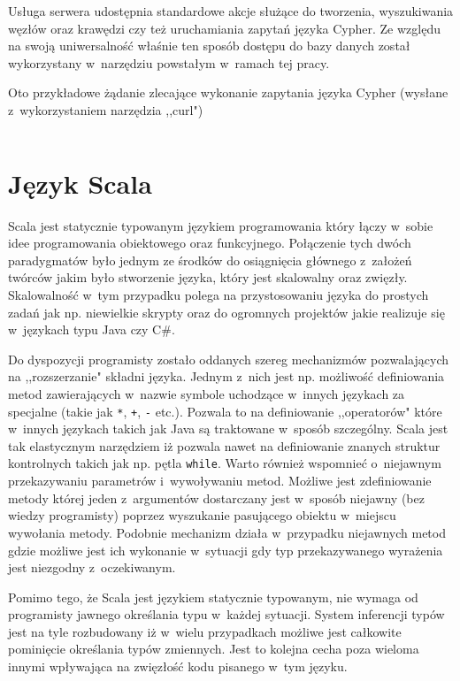 \documentclass{xmgr}
\begin{document}
Usługa serwera udostępnia standardowe akcje służące do tworzenia, wyszukiwania węzłów oraz krawędzi czy też uruchamiania zapytań języka Cypher. Ze względu na swoją uniwersalność właśnie ten sposób dostępu do bazy danych został wykorzystany w~narzędziu powstałym w~ramach tej pracy.

Oto przykładowe żądanie zlecające wykonanie zapytania języka Cypher (wysłane z~wykorzystaniem narzędzia ,,curl")

\inputminted{bash}{listings/bash/neo4j-rest-cypher.sh}

\chapter{Język Scala}

Scala jest statycznie typowanym językiem programowania który łączy w~sobie idee programowania obiektowego oraz funkcyjnego. Połączenie tych dwóch paradygmatów było jednym ze środków do osiągnięcia głównego z~założeń twórców jakim było stworzenie języka, który jest skalowalny oraz zwięzły. Skalowalność w~tym przypadku polega na przystosowaniu języka do prostych zadań jak np. niewielkie skrypty oraz do ogromnych projektów jakie realizuje się w~językach typu Java czy C\#.

Do dyspozycji programisty zostało oddanych szereg mechanizmów pozwalających na ,,rozszerzanie" składni języka. Jednym z~nich jest np. możliwość definiowania metod zawierających w~nazwie symbole uchodzące w~innych językach za specjalne (takie jak \texttt{*}, \texttt{+}, \texttt{-} etc.). Pozwala to na definiowanie ,,operatorów" które w~innych językach takich jak Java są traktowane w~sposób szczególny. Scala jest tak elastycznym narzędziem iż pozwala nawet na definiowanie znanych struktur kontrolnych takich jak np. pętla \texttt{while}. Warto również wspomnieć o~niejawnym przekazywaniu parametrów i~wywoływaniu metod. Możliwe jest zdefiniowanie metody której jeden z~argumentów dostarczany jest w~sposób niejawny (bez wiedzy programisty) poprzez wyszukanie pasującego obiektu w~miejscu wywołania metody. Podobnie mechanizm działa w~przypadku niejawnych metod gdzie możliwe jest ich wykonanie w~sytuacji gdy typ przekazywanego wyrażenia jest niezgodny z~oczekiwanym.

Pomimo tego, że Scala jest językiem statycznie typowanym, nie wymaga od programisty jawnego określania typu w~każdej sytuacji. System inferencji typów jest na tyle rozbudowany iż w~wielu przypadkach możliwe jest całkowite pominięcie określania typów zmiennych. Jest to kolejna cecha poza wieloma innymi wpływająca na zwięzłość kodu pisanego w~tym języku.
\end{document}
